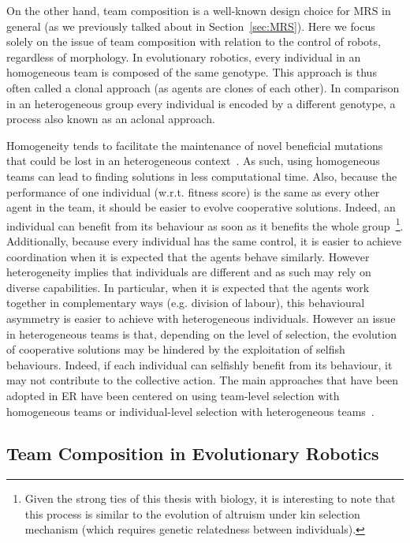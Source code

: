     On the other hand, team composition is a well-known design choice for MRS in general (as we previously talked about in Section~\ref{sec:MRS}). Here we focus solely on the issue of team composition with relation to the control of robots, regardless of morphology. In evolutionary robotics, every individual in an homogeneous team is composed of the same genotype. This approach is thus often called a clonal approach (as agents are clones of each other). In comparison in an heterogeneous group every individual is encoded by a different genotype, a process also known as an aclonal approach.

    Homogeneity tends to facilitate the maintenance of novel beneficial mutations that could be lost in an heterogeneous context~\parencite{Quinn2001}. As such, using homogeneous teams can lead to finding solutions in less computational time. Also, because the performance of one individual (w.r.t. fitness score) is the same as every other agent in the team, it should be easier to evolve cooperative solutions. Indeed, an individual can benefit from its behaviour as soon as it benefits the whole group~\footnote{Given the strong ties of this thesis with biology, it is interesting to note that this process is similar to the evolution of altruism under kin selection mechanism (which requires genetic relatedness between individuals).}. Additionally, because every individual has the same control, it is easier to achieve coordination when it is expected that the agents behave similarly. However heterogeneity implies that individuals are different and as such may rely on diverse capabilities. In particular, when it is expected that the agents work together in complementary ways (e.g. division of labour), this behavioural asymmetry is easier to achieve with heterogeneous individuals. However an issue in heterogeneous teams is that, depending on the level of selection, the evolution of cooperative solutions may be hindered by the exploitation of selfish behaviours. Indeed, if each individual can selfishly benefit from its behaviour, it may not contribute to the collective action. The main approaches that have been adopted in ER have been centered on using team-level selection with homogeneous teams or individual-level selection with heterogeneous teams~\parencite{Waibel2009}.

  \subsection{Team Composition in Evolutionary Robotics} %

